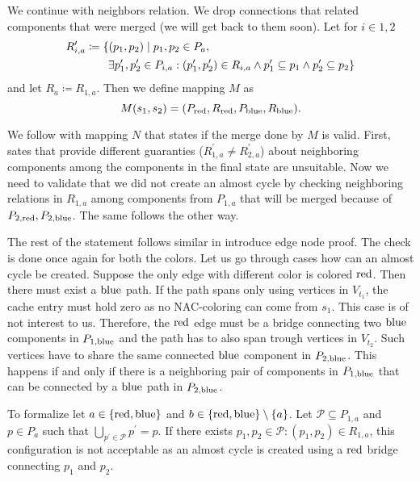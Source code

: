 We continue with neighbors relation. We drop connections that related components
that were merged (we will get back to them soon).
Let for \( i \in {1, 2} \)
%
\begin{align}
	R_{i,a}^\prime & \coloneqq \{(p_1, p_2) \mid p_1, p_2 \in P_a,   \notag                                                                                                            \\
	               & \qquad \exists p_1^\prime, p_2^\prime \in P_{i,a} : (p_1^\prime, p_2^\prime) \in R_{i,a} \land p_1^\prime \subseteq p_1 \land p_2^\prime \subseteq p_2\}   \notag
\end{align}
%
and \WLOG{} let \( R_a \coloneqq R_{1,a} \).
Then we define mapping \( M \) as \[ M(s_1, s_2) = (P_{\text{red}}, R_{\text{red}}, P_{\text{blue}}, R_{\text{blue}}). \]

We follow with mapping \( N \) that states if the merge done by \( M \) is valid.
First, sates that provide different guaranties
(\( R_{1,a}^\prime \not= R_{2,a}^\prime \)) about neighboring components
among the components in the final state are unsuitable.
Now we need to validate that we did not create an almost cycle by checking
neighboring relations in \( R_{1,a} \) among components from \( P_{1,a} \)
that will be merged because of \( P_{2,\text{red}}, P_{2,\text{blue}} \).
The same follows the other way.

The rest of the statement follows similar in introduce edge node proof.
The check is done once again for both the colors.
Let us go through cases how can an almost cycle be created.
Suppose the only edge with different color is colored \( \text{red} \).
Then there must exist a \( \text{blue} \) path. If the path spans only using vertices
in \( V_{t_1} \), the cache entry must hold zero as no NAC-coloring can come
from \( s_1 \). This case is of not interest to us.
Therefore, the \( \text{red} \) edge must be
a bridge connecting two \( \text{blue} \) components in \( P_{1,\text{blue}} \) and
the path has to also span trough vertices in \( V_{t_2} \).
Such vertices have to share the same connected \( \text{blue} \) component in \( P_{2,\text{blue}} \).
This happens if and only if there is a neighboring pair of components in \( P_{1,\text{blue}} \)
that can be connected by a \( \text{blue} \) path in \( P_{2,\text{blue}} \).

To formalize let \( a \in \{\text{red}, \text{blue} \}  \) and \( b \in \{\text{red}, \text{blue} \} \setminus \{a\} \).
Let \( \mathcal{P} \subseteq P_{1, a} \)
and \( p \in P_{a} \) such that \( \bigcup_{p^\prime \in \mathcal{P}} p^\prime = p \).
If there exists \( p_1, p_2 \in \mathcal{P} : (p_1, p_2) \in R_{1, a} \),
this configuration is not acceptable as an almost cycle is created
using a \( \text{red} \) bridge connecting \( p_1 \) and \( p_2 \).

